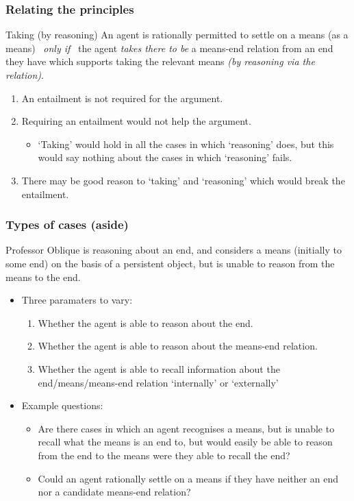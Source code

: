 \documentclass[noamssymb, compress, handout]{beamer} %
\begin{document}
\begin{frame}
  \frametitle{Relating the principles}

  \begin{block}{Taking (by reasoning)}
    An agent is rationally permitted to settle on a means (as a means)
    \newline
    \mbox{ }\hfill\emph{only if}\hfill\mbox{ }
    \newline
    the agent \emph{takes there to be}  a means-end relation from an end they have which supports taking the relevant means \emph{(by reasoning via the relation)}.
  \end{block}

  \begin{enumerate}
  \item An entailment is not required for the argument.
  \item Requiring an entailment would not help the argument.
    \begin{itemize}
    \item `Taking' would hold in all the cases in which `reasoning' does, but this would say nothing about the cases in which `reasoning' fails.
    \end{itemize}
  \item There may be good reason to `taking' and `reasoning' which would break the entailment.
  \end{enumerate}
\end{frame}


\begin{frame}
  \frametitle{Types of cases (aside)}

  Professor Oblique is reasoning about an end, and considers a means (initially to some end) on the basis of a persistent object, but is unable to reason from the means to the end.
  \begin{itemize}
  \item Three paramaters to vary:
    \begin{enumerate}
    \item Whether the agent is able to reason about the end.
    \item Whether the agent is able to reason about the means-end relation.
    \item Whether the agent is able to recall information about the end/means/means-end relation `internally' or `externally'
    \end{enumerate}
  \item Example questions:
    \begin{itemize}
    \item Are there cases in which an agent recognises a means, but is unable to recall what the means is an end to, but would easily be able to reason from the end to the means were they able to recall the end?
    \item Could an agent rationally settle on a means if they have neither an end nor a candidate means-end relation?
    \end{itemize}
  \end{itemize}
\end{frame}
\end{document}
